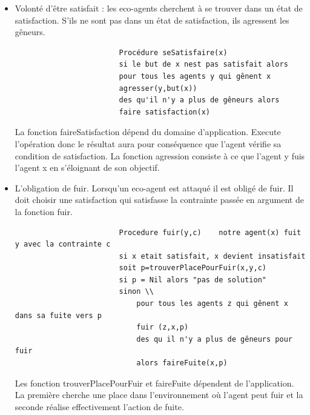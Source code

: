             \begin{itemize}
                \item  Volonté d'être satisfait : les eco-agents cherchent à se trouver dans un état de satisfaction. S'ils ne sont pas dans un état de satisfaction, ils agressent les gêneurs. \\
                    \begin{verbatim}
                        Procédure seSatisfaire(x) 
                        si le but de x nest pas satisfait alors 
                        pour tous les agents y qui gênent x 
                        agresser(y,but(x))
                        des qu'il n'y a plus de gêneurs alors 
                        faire satisfaction(x)
                    \end{verbatim}
                    La fonction faireSatisfaction dépend du domaine d'application. Execute l'opération donc le résultat aura pour conséquence que l'agent vérifie sa condition de satisfaction. La fonction agression consiste à ce que l'agent y fuis l'agent x en s'éloignant de son objectif.  
                \item L'obligation de fuir. Lorsqu'un eco-agent est attaqué il est obligé de fuir. Il doit choisir une satisfaction qui satisfasse la contrainte passée en argument de la fonction fuir. \\
                    \begin{verbatim}
                        Procedure fuir(y,c)    notre agent(x) fuit y avec la contrainte c
                        si x etait satisfait, x devient insatisfait 
                        soit p=trouverPlacePourFuir(x,y,c) 
                        si p = Nil alors "pas de solution"
                        sinon \\
                            pour tous les agents z qui gênent x dans sa fuite vers p 
                            fuir (z,x,p) 
                            des qu il n'y a plus de gêneurs pour fuir
                            alors faireFuite(x,p) 
                    \end{verbatim}    
                Les fonction trouverPlacePourFuir et faireFuite dépendent de l'application. La première cherche une place dans l'environnement où l'agent peut fuir et la seconde réalise effectivement l'action de fuite.     
            \end{itemize}
